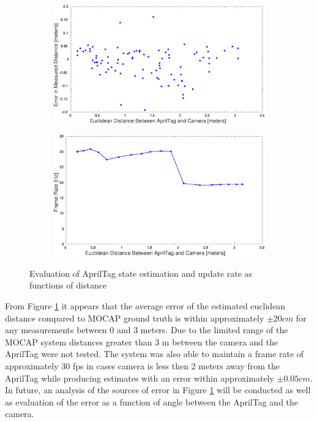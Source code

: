 \documentclass[11pt, twocolumn]{article}
\begin{document}
\begin{figure}	
	\centering
	\begin{subfigure}[b]{\linewidth}
		\includegraphics[width=\textwidth]{images/Apr_FPS_vs_Dist.eps}
		\caption{}		
	\end{subfigure}

	\begin{subfigure}[b]{\linewidth}
		\includegraphics[width=\textwidth]{images/Apr_Distance_Error.eps}
		\caption{}		
	\end{subfigure}
	\caption{Evaluation of AprilTag state estimation and update rate as functions of distance}
	\label{fig:AprilTag_eval}	
\end{figure}

From Figure \ref{fig:AprilTag_eval} it appears that the average error of the estimated euclidean distance compared to MOCAP ground truth is within approximately $\pm 20 cm$ for any measurements between 0 and 3 meters. Due to the limited range of the MOCAP system distances greater than 3 m between the camera and the AprilTag were not tested. The system was also able to maintain a frame rate of approximately 30 fps in cases camera is less then 2 meters away from the AprilTag while producing estimates with an error within approximately $\pm 0.05 cm$. In future, an analysis of the sources of error in Figure \ref{fig:AprilTag_eval} will be conducted as well as evaluation of the error as a function of angle between the AprilTag and the camera. 
\end{document}
